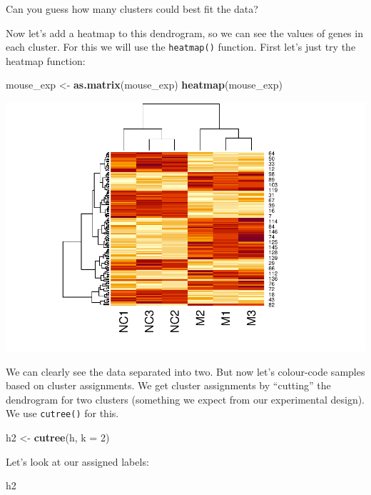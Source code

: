 \documentclass[
]{book}
\newenvironment{Shaded}{\begin{snugshade}}{\end{snugshade}}
\newcommand{\AttributeTok}[1]{\textcolor[rgb]{0.13,0.29,0.53}{#1}}
\newcommand{\DecValTok}[1]{\textcolor[rgb]{0.00,0.00,0.81}{#1}}
\newcommand{\FunctionTok}[1]{\textcolor[rgb]{0.13,0.29,0.53}{\textbf{#1}}}
\newcommand{\NormalTok}[1]{#1}
\newcommand{\OtherTok}[1]{\textcolor[rgb]{0.56,0.35,0.01}{#1}}
\begin{document}
Can you guess how many clusters could best fit the data?

Now let's add a heatmap to this dendrogram, so we can see the values of genes in each cluster. For this we will use the \texttt{heatmap()} function. First let's just try the heatmap function:

\begin{Shaded}
\begin{Highlighting}[]
\NormalTok{mouse\_exp }\OtherTok{\textless{}{-}} \FunctionTok{as.matrix}\NormalTok{(mouse\_exp)}
\FunctionTok{heatmap}\NormalTok{(mouse\_exp)}
\end{Highlighting}
\end{Shaded}

\includegraphics{_main_files/figure-latex/unnamed-chunk-13-1.pdf}

We can clearly see the data separated into two. But now let's colour-code samples based on cluster assignments. We get cluster assignments by ``cutting'' the dendrogram for two clusters (something we expect from our experimental design). We use \texttt{cutree()} for this.

\begin{Shaded}
\begin{Highlighting}[]
\NormalTok{h2 }\OtherTok{\textless{}{-}} \FunctionTok{cutree}\NormalTok{(h, }\AttributeTok{k =} \DecValTok{2}\NormalTok{)}
\end{Highlighting}
\end{Shaded}

Let's look at our assigned labels:

\begin{Shaded}
\begin{Highlighting}[]
\NormalTok{h2}
\end{Highlighting}
\end{Shaded}
\end{document}
